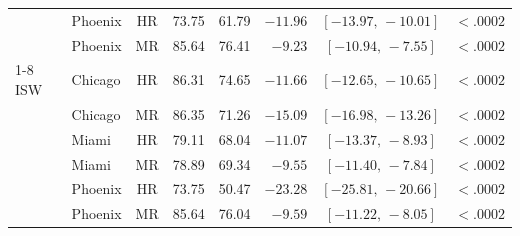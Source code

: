 \begin{table}[h]
\begin{tabular}{@{}llcrrrcr@{}}
          & Phoenix & HR & 73.75 & 61.79 & $-11.96$ & $[-13.97,\,-10.01]$ & $<\!.0002$ \\
          & Phoenix & MR & 85.64 & 76.41 & $-9.23$  & $[-10.94,\,-7.55]$  & $<\!.0002$ \\
\cmidrule(l){1-8}
ISW       & Chicago & HR & 86.31 & 74.65 & $-11.66$ & $[-12.65,\,-10.65]$ & $<\!.0002$ \\
          & Chicago & MR & 86.35 & 71.26 & $-15.09$ & $[-16.98,\,-13.26]$ & $<\!.0002$ \\
          & Miami   & HR & 79.11 & 68.04 & $-11.07$ & $[-13.37,\,-8.93]$  & $<\!.0002$ \\
          & Miami   & MR & 78.89 & 69.34 & $-9.55$  & $[-11.40,\,-7.84]$  & $<\!.0002$ \\
          & Phoenix & HR & 73.75 & 50.47 & $-23.28$ & $[-25.81,\,-20.66]$ & $<\!.0002$ \\
          & Phoenix & MR & 85.64 & 76.04 & $-9.59$  & $[-11.22,\,-8.05]$  & $<\!.0002$ \\
\bottomrule
\end{tabular}
\end{table}

